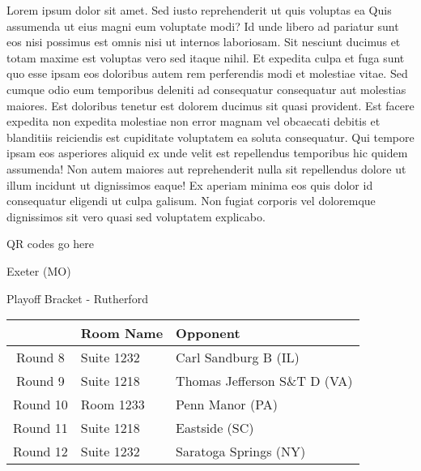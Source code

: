 \documentclass{article}%
\begin{document}
\vspace*{8pt}%
\linebreak%
\newline%
\newline%
Lorem ipsum dolor sit amet. Sed iusto reprehenderit ut quis voluptas ea Quis assumenda ut eius magni eum voluptate modi? Id unde libero ad pariatur sunt eos nisi possimus est omnis nisi ut internos laboriosam. Sit nesciunt ducimus et totam maxime est voluptas vero sed itaque nihil. Et expedita culpa et fuga sunt quo esse ipsam eos doloribus autem rem perferendis modi et molestiae vitae.\newline%
\newline%
Sed cumque odio eum temporibus deleniti ad consequatur consequatur aut molestias maiores. Est doloribus tenetur est dolorem ducimus sit quasi provident. Est facere expedita non expedita molestiae non error magnam vel obcaecati debitis et blanditiis reiciendis est cupiditate voluptatem ea soluta consequatur. Qui tempore ipsam eos asperiores aliquid ex unde velit est repellendus temporibus hic quidem assumenda!\newline%
\newline%
Non autem maiores aut reprehenderit nulla sit repellendus dolore ut illum incidunt ut dignissimos eaque! Ex aperiam minima eos quis dolor id consequatur eligendi ut culpa galisum. Non fugiat corporis vel doloremque dignissimos sit vero quasi sed voluptatem explicabo.\newline%
\newline%
%
\vspace*{30pt}%
\begin{center}%
\begin{Huge}%
QR codes go here%
\end{Huge}%
\end{center}%
\newpage%
\begin{center}%
\begin{Huge}%
Exeter (MO)%
\end{Huge}%
\vspace*{8pt}%
\linebreak%
\begin{Large}%
Playoff Bracket {-} Rutherford%
\end{Large}%
\end{center}%
%
\begin{tabularx}{\textwidth}{|c|Y|Y|}%
\hline%
&Room Name&Opponent\\%
\hline%
Round 8&Suite 1232&Carl Sandburg B (IL)\\%
Round 9&Suite 1218&Thomas Jefferson S\&T D (VA)\\%
Round 10&Room 1233&Penn Manor (PA)\\%
Round 11&Suite 1218&Eastside (SC)\\%
Round 12&Suite 1232&Saratoga Springs (NY)\\%
\hline%
\end{tabularx}%
\end{document}
